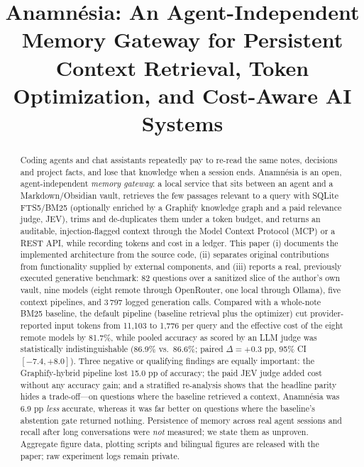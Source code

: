 \documentclass[conference,onecolumn,11pt]{IEEEtran}
\newcommand{\anam}{Anam\-n\'esia}
\begin{document}
\title{Anam\-n\'esia: An Agent-Independent Memory Gateway for Persistent Context Retrieval, Token Optimization, and Cost-Aware AI Systems}

\author{
}

\maketitle

\begin{abstract}
Coding agents and chat assistants repeatedly pay to re-read the same notes, decisions and project facts, and lose that knowledge when a session ends. \anam{} is an open, agent-independent \emph{memory gateway}: a local service that sits between an agent and a Markdown/Obsidian vault, retrieves the few passages relevant to a query with SQLite FTS5/BM25 (optionally enriched by a Graphify knowledge graph and a paid relevance judge, JEV), trims and de-duplicates them under a token budget, and returns an auditable, injection-flagged context through the Model Context Protocol (MCP) or a REST API, while recording tokens and cost in a ledger. This paper (i) documents the implemented architecture from the source code, (ii) separates original contributions from functionality supplied by external components, and (iii) reports a real, previously executed generative benchmark: 82 questions over a sanitized slice of the author's own vault, nine models (eight remote through OpenRouter, one local through Ollama), five context pipelines, and 3\,797 logged generation calls. Compared with a whole-note BM25 baseline, the default pipeline (baseline retrieval plus the optimizer) cut provider-reported input tokens from 11{,}103 to 1{,}776 per query and the effective cost of the eight remote models by 81.7\%, while pooled accuracy as scored by an LLM judge was statistically indistinguishable (86.9\% vs.\ 86.6\%; paired $\Delta{=}{+}0.3$ pp, 95\% CI $[-7.4,+8.0]$). Three negative or qualifying findings are equally important: the Graphify-hybrid pipeline lost 15.0 pp of accuracy; the paid JEV judge added cost without any accuracy gain; and a stratified re-analysis shows that the headline parity hides a trade-off---on questions where the baseline retrieved a context, \anam{} was 6.9 pp \emph{less} accurate, whereas it was far better on questions where the baseline's abstention gate returned nothing. Persistence of memory across real agent sessions and recall after long conversations were \emph{not} measured; we state them as unproven. Aggregate figure data, plotting scripts and bilingual figures are released with the paper; raw experiment logs remain private.
\end{abstract}
\end{document}
